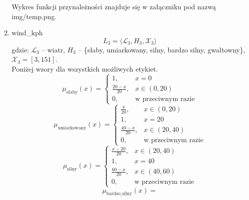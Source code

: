 \documentclass{article}
\begin{document}
\begin{enumerate}
Wykres funkcji przynależności znajduje się w załączniku pod nazwą img/temp.png.

    \item wind\_kph
        \begin{equation}
            L_3 = \langle \mathcal{L}_3, H_3, \mathcal{X}_3 \rangle
        \end{equation}
        gdzie: $\mathcal{L}_3$ – wiatr, $H_3$ – \{słaby, umiarkowany, silny, bardzo silny, gwałtowny\}, $\mathcal{X}_3 = [3, 151]$. \\
        Poniżej wzory dla wszystkich możliwych etykiet.
                  \begin{equation}
                    \mu_{\text{słaby}}(x) =
                    \begin{cases}
                    1, & x = 0 \\
                    \frac{20 - x}{20}, & x \in (0, 20) \\
                    0, & \text{w przeciwnym razie}
                    \end{cases}
                  \end{equation}
                \begin{equation}
                    \mu_{\text{umiarkowany}}(x) =
                    \begin{cases}
                    \frac{x}{20}, & x \in (0, 20) \\
                    1, & x = 20 \\
                    \frac{40 - x}{20}, & x \in (20, 40) \\
                    0, & \text{w przeciwnym razie}
                    \end{cases}
                  \end{equation}
                \begin{equation}
                    \mu_{\text{silny}}(x) =
                    \begin{cases}
                    \frac{x - 20}{20}, & x \in (20, 40) \\
                    1, & x = 40 \\
                    \frac{60 - x}{20}, & x \in (40, 60) \\
                    0, & \text{w przeciwnym razie}
                    \end{cases}
              \end{equation}
                \begin{equation}
                    \mu_{\text{bardzo\_silny}}(x) =

\end{equation}
\end{enumerate}
\end{document}
